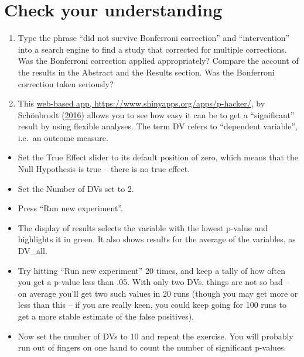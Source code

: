 \documentclass{krantz}
\begin{document}
\hypertarget{check-your-understanding-13}{%
\section{Check your understanding}\label{check-your-understanding-13}}

\begin{enumerate}
\def\labelenumi{\arabic{enumi}.}
\item
  Type the phrase ``did not survive Bonferroni correction'' and ``intervention'' into a search engine to find a study that corrected for multiple corrections. Was the Bonferroni correction applied appropriately? Compare the account of the results in the Abstract and the Results section. Was the Bonferroni correction taken seriously?
\item
  This \href{https://www.shinyapps.org/apps/p-hacker/}{web-based app, https://www.shinyapps.org/apps/p-hacker/}, by Schönbrodt (\protect\hyperlink{ref-schonbrodt2016}{2016}) allows you to see how easy it can be to get a ``significant'' result by using flexible analyses. The term DV refers to ``dependent variable'', i.e.~an outcome measure.\\
\end{enumerate}

\begin{itemize}
\item
  Set the True Effect slider to its default position of zero, which means that the Null Hypothesis is true -- there is no true effect.\\
\item
  Set the Number of DVs set to 2.\\
\item
  Press ``Run new experiment''.\\
\item
  The display of results selects the variable with the lowest p-value and highlights it in green. It also shows results for the average of the variables, as DV\_all.
\item
  Try hitting ``Run new experiment'' 20 times, and keep a tally of how often you get a p-value less than .05. With only two DVs, things are not so bad -- on average you'll get two such values in 20 runs (though you may get more or less than this -- if you are really keen, you could keep going for 100 runs to get a more stable estimate of the false positives).\\
\item
  Now set the number of DVs to 10 and repeat the exercise. You will probably run out of fingers on one hand to count the number of significant p-values.
\end{itemize}
\end{document}
